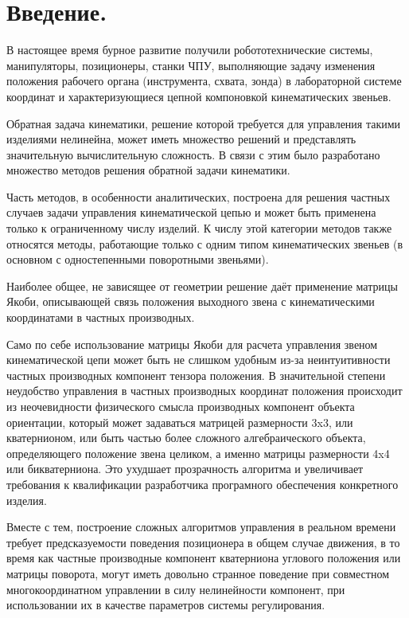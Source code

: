 \section{Введение.}

В настоящее время бурное развитие получили робототехнические системы, манипуляторы, позиционеры, станки ЧПУ, выполняющие задачу изменения положения рабочего органа (инструмента, схвата, зонда) в лабораторной системе координат и характеризующиеся цепной компоновкой кинематических звеньев.

Обратная задача кинематики, решение которой требуется для управления такими изделиями нелинейна, может иметь множество решений и представлять значительную вычислительную сложность. В связи с этим было разработано множество методов решения обратной задачи кинематики.

Часть методов, в особенности аналитических, построена для решения частных случаев задачи управления кинематической цепью и может быть применена только к ограниченному числу изделий. К числу этой категории методов также относятся методы, работающие только с одним типом кинематических звеньев (в основном с одностепенными поворотными звеньями).

Наиболее общее, не зависящее от геометрии решение даёт применение матрицы Якоби, описывающей связь положения выходного звена с кинематическими координатами в частных производных.

Само по себе использование матрицы Якоби для расчета управления звеном кинематической цепи может быть не слишком удобным из-за неинтуитивности частных производных компонент тензора положения. В значительной степени неудобство управления в частных производных координат положения происходит из неочевидности физического смысла производных компонент объекта ориентации, который может задаваться матрицей размерности 3x3, или кватернионом, или быть частью более сложного алгебраического объекта, определяющего положение звена целиком, а именно матрицы размерности 4x4 или бикватерниона. Это ухудшает прозрачность алгоритма и увеличивает требования к квалификации разработчика програмного обеспечения конкретного изделия.

Вместе с тем, построение сложных алгоритмов управления в реальном времени требует предсказуемости поведения позиционера в общем случае движения, в то время как частные производные компонент кватерниона углового положения или матрицы поворота, могут иметь довольно странное поведение при совместном многокоординатном управлении в силу нелинейности компонент, при использовании их в качестве параметров системы регулирования. 

